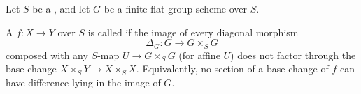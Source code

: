 \begin{definition} \label{definition:G_unramified_morphism_of_schemes}
    Let $S$ be a , and let $G$ be a finite flat group scheme over $S$.

    A  $f: X \to Y$ over $S$ is called  if the image of every diagonal morphism
    $$\Delta_G: G \to G \times_S G$$
    composed with any $S$-map $U \to G \times_S G$ (for affine $U$) does not factor through the base change $X \times_S Y \to X \times_S X$. Equivalently, no section of a base change of $f$ can have difference lying in the image of $G$.
\end{definition}
